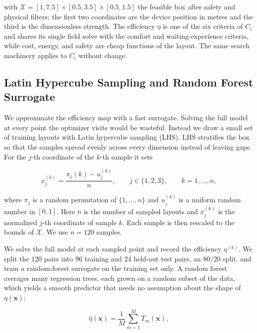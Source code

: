 \documentclass[11pt]{article}
\begin{document}
with $\mathcal{X}=[1,7.5]\times[0.5,3.5]\times[0.5,1.5]$ the feasible box after
safety and physical filters; the first two coordinates are the device position
in metres and the third is the dimensionless strength. The efficiency $\eta$ is
one of the six criteria of $C_i$ and shares its single field solve with the
comfort and waiting-experience criteria, while cost, energy, and safety are
cheap functions of the layout. The same search machinery applies to $C_i$
without change.

\subsection{Latin Hypercube Sampling and Random Forest Surrogate}

We approximate the efficiency map with a fast surrogate. Solving the full model
at every point the optimizer visits would be wasteful. Instead we draw a small
set of training layouts with Latin hypercube sampling (LHS). LHS stratifies the
box so that the samples spread evenly across every dimension instead of leaving
gaps. For the $j$-th coordinate of the $k$-th sample it sets

\begin{equation}
x_j^{(k)} = \frac{\pi_j(k)-u_j^{(k)}}{n},
\qquad
j\in\{1,2,3\},
\qquad
k=1,\dots,n,
\label{eq:lhs}
\end{equation}

where $\pi_j$ is a random permutation of $\{1,\dots,n\}$ and $u_j^{(k)}$ is a
uniform random number in $[0,1]$. Here $n$ is the number of sampled layouts and
$x_j^{(k)}$ is the normalized $j$-th coordinate of sample $k$. Each sample is then rescaled to the bounds of
$\mathcal{X}$. We use $n=120$ samples.

We solve the full model at each sampled point and record the efficiency
$\eta^{(k)}$. We split the $120$ pairs into $96$ training and $24$ held-out
test pairs, an $80/20$ split, and train a random-forest surrogate on the
training set only. A random forest averages many regression trees, each
grown on a random subset of the data, which yields a smooth predictor that needs
no assumption about the shape of $\eta(\mathbf{x})$:

\begin{equation}
\hat\eta(\mathbf{x}) = \frac{1}{M}\sum_{m=1}^{M} T_m(\mathbf{x}),
\label{eq:rf}
\end{equation}
\end{document}
